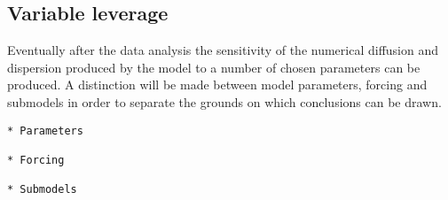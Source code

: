\subsection{Variable leverage}\label{variable-leverage}

Eventually after the data analysis the sensitivity of the numerical
diffusion and dispersion produced by the model to a number of chosen
parameters can be produced. A distinction will be made between model
parameters, forcing and submodels in order to separate the grounds on
which conclusions can be drawn.

\begin{verbatim}
* Parameters

* Forcing 

* Submodels
\end{verbatim}
